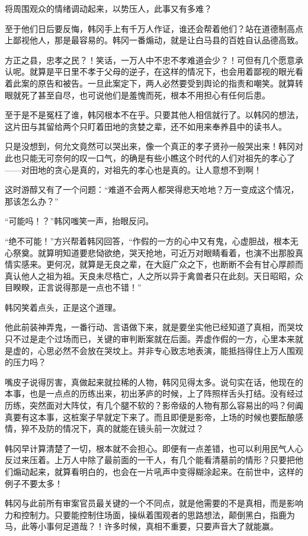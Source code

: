 将周围观众的情绪调动起来，以势压人，此事又有多难？

至于他们日后要反悔，韩冈手上有千万人作证，谁还会帮着他们？站在道德制高点上鄙视他人，那是最容易的。韩冈一番煽动，就是让白马县的百姓自认品德高致。

方正之县，忠孝之民？！笑话，一万人中不忠不孝难道会少？！可但有几个愿意承认呢。就算是平日里不孝于父母的逆子，在这样的情况下，也会用着鄙视的眼光看着此案的原告和被告。一旦此案定下，两人必然要受到舆论的指责和嘲笑。就算转眼就死了甚至自尽，也可说他们是羞愧而死，根本不用担心有任何后患。

至于是不是冤枉了谁，韩冈根本不在乎。只要其他人相信就行了。以韩冈的想法，这片田与其留给两个只盯着田地的贪婪之辈，还不如用来奉养县中的读书人。

只是没想到，何允文竟然可以哭出来，像一个真正的孝子贤孙一般哭出来！韩冈对此也只能无可奈何的叹一口气，的确是有些小瞧这个时代的人们对祖先的孝心了——对田地的贪心是真的，对祖先的孝心也是真的。让人意想不到啊！

这时游醇又有了一个问题：“难道不会两人都哭得悲天呛地？万一变成这个情况，那该怎么办？”

“可能吗！？”韩冈嗤笑一声，抬眼反问。

“绝不可能！”方兴帮着韩冈回答，“作假的一方的心中又有鬼，心虚胆战，根本无心祭奠。就算明知道要悲恸欲绝，哭天抢地，可近万对眼睛看着，也演不出那股真情实感来。更何况，就算是无良之辈，在大庭广众之下，也断断不会有甘心厚颜而真认他人之祖为祖。天良未尽梏亡，人之所以异于禽兽者只在此刻。天日昭昭，众目睽睽，正言说得那是一点也不错！”

韩冈笑着点头，正是这个道理。

他此前装神弄鬼，一番行动、言语做下来，就是要坐实他已经知道了真相，而哭坟只不过是走个过场而已，关键的审判断案就在后面。弄虚作假的一方，心里本来就是虚的，心思必然不会放在哭坟上。并非专心致志地表演，能抵挡得住上万人围观的压力吗？

嘴皮子说得厉害，真做起来就拉稀的人物，韩冈见得太多。说句实在话，他现在的本事，也是一点点的历练出来，初出茅庐的时候，上了阵照样舌头打结。没有经过历练，突然面对大阵仗，有几个腿不软的？影帝级的人物有那么容易出的吗？何阗真要有这本事，这桩案子早就定下来了。而且即便是影帝，上场的时候也要酝酿感情，猝不及防的情况下，真的就能在镜头前一次就过？

韩冈早计算清楚了一切，根本就不会担心。即便有一点差错，也可以利用民气人心反过来压着。上万人中除了最前面的一干人，有几个能看清墓前的情形？只要把他们煽动起来，就算看明白的，也会在一片吼声中变得糊涂起来。在前世中，这样的例子不要太多！

韩冈与此前所有审案官员最关键的一个不同点，就是他需要的不是真相，而是影响力和控制力。只要能控制住场面，操纵着围观者的思路想法，颠倒黑白，指鹿为马，此等小事何足道哉？！许多时候，真相不重要，只要声音大了就能赢。

